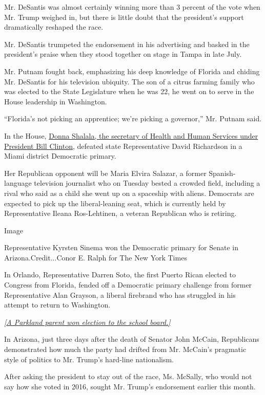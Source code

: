 Mr. DeSantis was almost certainly winning more than 3 percent of the
vote when Mr. Trump weighed in, but there is little doubt that the
president's support dramatically reshaped the race.

Mr. DeSantis trumpeted the endorsement in his advertising and basked in
the president's praise when they stood together on stage in Tampa in
late July.

Mr. Putnam fought back, emphasizing his deep knowledge of Florida and
chiding Mr. DeSantis for his television ubiquity. The son of a citrus
farming family who was elected to the State Legislature when he was 22,
he went on to serve in the House leadership in Washington.

``Florida's not picking an apprentice; we're picking a governor,'' Mr.
Putnam said.

In the House,
\href{https://www.nytimes3xbfgragh.onion/2018/08/27/us/politics/donna-shalala-congress.html}{Donna
Shalala, the secretary of Health and Human Services under President Bill
Clinton}, defeated state Representative David Richardson in a Miami
district Democratic primary.

Her Republican opponent will be Maria Elvira Salazar, a former
Spanish-language television journalist who on Tuesday bested a crowded
field, including a rival who said as a child she went up on a spaceship
with aliens. Democrats are expected to pick up the liberal-leaning seat,
which is currently held by Representative Ileana Ros-Lehtinen, a veteran
Republican who is retiring.

Image

Representative Kyrsten Sinema won the Democratic primary for Senate in
Arizona.Credit...Conor E. Ralph for The New York Times

In Orlando, Representative Darren Soto, the first Puerto Rican elected
to Congress from Florida, fended off a Democratic primary challenge from
former Representative Alan Grayson, a liberal firebrand who has
struggled in his attempt to return to Washington.

\emph{{[}}\href{https://www.nytimes3xbfgragh.onion/2018/08/28/us/parkland-school-board-election.html}{\emph{A
Parkland parent won election to the school board.{]}}}

In Arizona, just three days after the death of Senator John McCain,
Republicans demonstrated how much the party had drifted from Mr.
McCain's pragmatic style of politics to Mr. Trump's hard-line
nationalism.

After asking the president to stay out of the race, Ms. McSally, who
would not say how she voted in 2016, sought Mr. Trump's endorsement
earlier this month.

